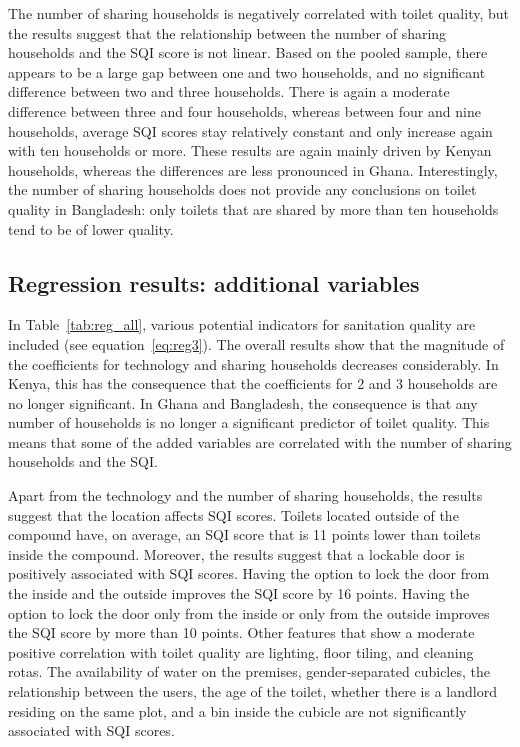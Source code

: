 \documentclass[natbib]{svjour3}                     %
\begin{document}
The number of sharing households is negatively correlated with toilet quality, but the results suggest that the relationship between the number of sharing households and the SQI score is not linear. Based on the pooled sample, there appears to be a large gap between one and two households, and no significant difference between two and three households. There is again a moderate difference between three and four households, whereas between four and nine households, average SQI scores stay relatively constant and only increase again with ten households or more. These results are again mainly driven by Kenyan households, whereas the differences are less pronounced in Ghana. Interestingly, the number of sharing households does not provide any conclusions on toilet quality in Bangladesh: only toilets that are shared by more than ten households tend to be of lower quality.

\subsection{Regression results: additional variables}

In Table~\ref{tab:reg_all}, various potential indicators for sanitation quality are included (see equation~\ref{eq:reg3}). The overall results show that the magnitude of the coefficients for technology and sharing households decreases considerably. In Kenya, this has the consequence that the coefficients for 2 and 3 households are no longer significant. In Ghana and Bangladesh, the consequence is that any number of households is no longer a significant predictor of toilet quality. This means that some of the added variables are correlated with the number of sharing households and the SQI.



Apart from the technology and the number of sharing households, the results suggest that the location affects SQI scores. Toilets located outside of the compound have, on average, an SQI score that is 11 points lower than toilets inside the compound. Moreover, the results suggest that a lockable door is positively associated with SQI scores. Having the option to lock the door from the inside and the outside improves the SQI score by 16 points. Having the option to lock the door only from the inside or only from the outside improves the SQI score by more than 10 points. Other features that show a moderate positive correlation with toilet quality are lighting, floor tiling, and cleaning rotas. The availability of water on the premises, gender-separated cubicles, the relationship between the users, the age of the toilet, whether there is a landlord residing on the same plot, and a bin inside the cubicle are not significantly associated with SQI scores. 
\end{document}
